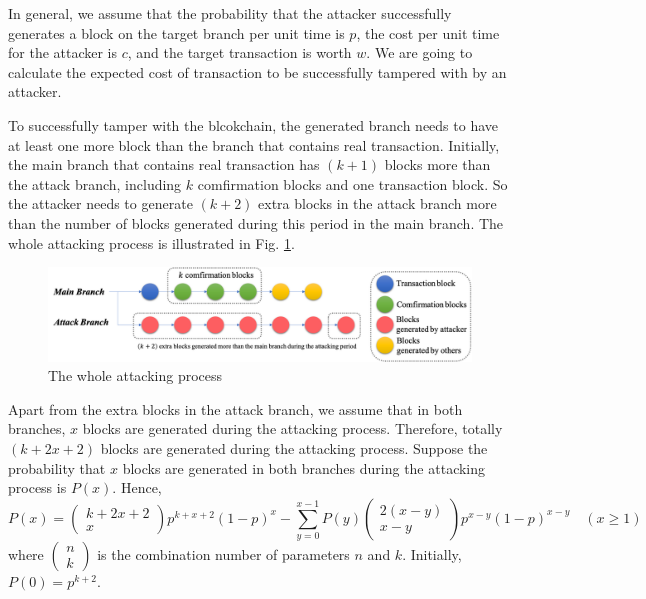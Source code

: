 \documentclass{oxmathproblems}
\makeatletter
\theoremstyle{definition}
\renewenvironment{solution}[1][Solution] {\par\pushQED{\qed}\normalfont\topsep6\p@\@plus6\p@\relax\trivlist\item[\hskip\labelsep\bfseries#1\@addpunct{.}]\ignorespaces}{\popQED\endtrivlist\@endpefalse} \makeatother
\makeatother
\begin{document}
\begin{solution}
	In general, we assume that the probability that the attacker successfully generates a block on the target branch per unit time is $p$, the cost per unit time for the attacker is $c$, and the target transaction is worth $w$. We are going to calculate the expected cost of transaction to be successfully tampered with by an attacker.

	To successfully tamper with the blcokchain, the generated branch needs to have at least one more block than the branch that contains real transaction. Initially, the main branch that contains real transaction has $(k + 1)$ blocks more than the attack branch, including $k$ comfirmation blocks and one transaction block. So the attacker needs to generate $(k + 2)$ extra blocks in the attack branch more than the number of blocks generated during this period in the main branch. The whole attacking process is illustrated in Fig. \ref{fig1}.
	\begin{figure}[htbp]
		\centering
		\includegraphics[width=\linewidth]{1.png}
		\caption{The whole attacking process}
		\label{fig1}
	\end{figure}

	Apart from the extra blocks in the attack branch, we assume that in both branches, $x$ blocks are generated during the attacking process. Therefore, totally $(k + 2x + 2)$ blocks are generated during the attacking process. Suppose the probability that $x$ blocks are generated in both branches during the attacking process is $P(x)$. Hence,
	$$
	P(x) = \left(\begin{matrix}k+2x+2 \\ x\end{matrix}\right) p^{k+x+2} (1-p)^x - \sum_{y=0}^{x-1} P(y) \left(\begin{matrix}2(x - y) \\ x - y\end{matrix}\right)p^{x-y}(1-p)^{x-y} \quad (x \ge 1)
	$$
	where $\left(\begin{matrix}n \\ k\end{matrix}\right)$ is the combination number of parameters $n$ and $k$. Initially, $P(0) = p^{k+2}$.
	

\end{solution}
\end{document}
